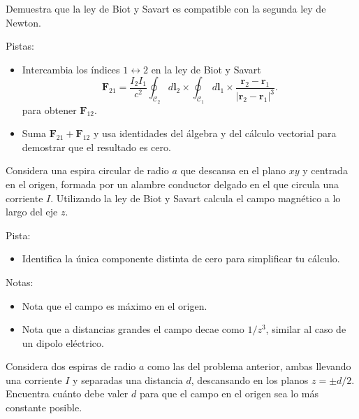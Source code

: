 \documentclass{exam}
\begin{document}
\begin{questions}
  \question Demuestra que la ley de Biot y Savart es compatible con la
    segunda ley de Newton.

    Pistas:
    \begin{itemize}
    \item Intercambia los índices $1\leftrightarrow2$ en la ley
      de Biot y Savart
      $$
      \bm F_{21}=\frac{I_2I_1}{c^2}\oint_{\mathcal
        C_2}d\bm l_2\times\oint_{\mathcal C_1}d\bm l_1\times \frac{\bm r_2-\bm r_1}{|\bm
        r_2-\bm r_1|^3}.
      $$
      para obtener $\bm F_{12}$.
    \item Suma $\bm F_{21}+\bm F_{12}$ y usa identidades del álgebra y
      del cálculo vectorial para demostrar que el resultado es cero.
    \end{itemize}

  \question Considera una espira circular de radio $a$ que descansa en
    el plano $xy$ y centrada en el origen, formada por un alambre
    conductor delgado en el que circula una corriente $I$. Utilizando
    la ley de Biot y Savart calcula el campo magnético a lo largo del
    eje $z$.

    Pista:
    \begin{itemize}
    \item Identifica la única componente distinta de cero para
      simplificar tu cálculo.
    \end{itemize}
    Notas:
    \begin{itemize}
    \item Nota que el campo es máximo en el origen.
    \item Nota que a distancias grandes el campo decae como $1/z^3$,
      similar al caso de un dipolo eléctrico.
    \end{itemize}

  \question Considera dos espiras de radio $a$ como las del problema
    anterior, ambas llevando una corriente $I$ y
    separadas una distancia $d$, descansando en los planos $z=\pm d/2$. Encuentra cuánto
    debe valer $d$ para que el campo en el origen sea lo más constante
    posible.


\end{questions}
\end{document}

